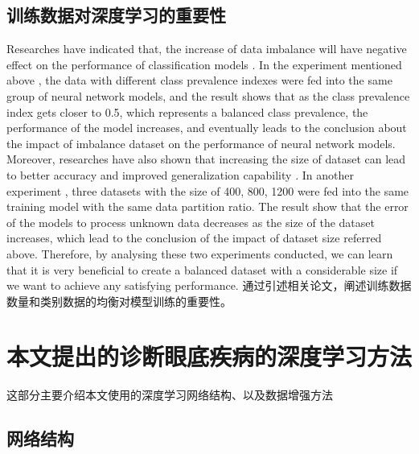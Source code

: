 \documentclass{ijisa}
\begin{document}
\subsection{训练数据对深度学习的重要性}
Researches have indicated that, the increase of data imbalance will have negative effect on the performance of classification models \cite{mazurowski2008training}. In the experiment mentioned above \cite{mazurowski2008training}, the data with different class prevalence indexes were fed into the same group of neural network models, and the result shows that as the class prevalence index gets closer to 0.5, which represents a balanced class prevalence, the performance of the model increases, and eventually leads to the conclusion about the impact of imbalance dataset on the performance of neural network models. 
Moreover, researches have also shown that increasing the size of dataset can lead to better accuracy and improved generalization capability \cite{ajiboye2015evaluating}. In another experiment \cite{ajiboye2015evaluating}, three datasets with the size of 400, 800, 1200 were fed into the same training model with the same data partition ratio. The result show that the error of the models to process unknown data decreases as the size of the dataset increases, which lead to the conclusion of the impact of dataset size referred above. Therefore, by analysing these two experiments conducted, we can learn that it is very beneficial to create a balanced dataset with a considerable size if we want to achieve any satisfying performance.
通过引述相关论文，阐述训练数据数量和类别数据的均衡对模型训练的重要性。

\section{本文提出的诊断眼底疾病的深度学习方法}

这部分主要介绍本文使用的深度学习网络结构、以及数据增强方法

\subsection{网络结构}
\end{document}
